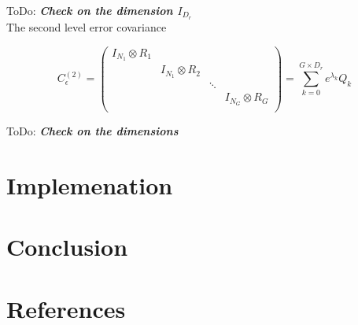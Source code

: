 \documentclass[final, paper=letter,5p,times,twocolumn]{elsarticle}
\newcommand{\ToDo}[1]{ToDo: \textbf{\textit{#1}}}
\theoremstyle{definition}
\begin{document}
\ToDo{Check on the dimension $I_{D_{r}}$} \\
The second level error covariance
  
\begin{equation}
  C_{\epsilon}^{(2)} =
  \left (
  \begin{array}{cccc}
    I_{N_{1}} \otimes R_{1} &&& \\
    &I_{N_{1}} \otimes R_{2} && \\
    && \ddots & \\
    &&& I_{N_{G}} \otimes R_{G} \\
  \end{array}
  \right ) =  \sum_{k = 0}^{G \times D_{r}} e^{\lambda_{k}} Q_{k}
  \label{}
\end{equation}

\ToDo{Check on the dimensions} \\

\section{Implemenation}




\section{Conclusion}

\section*{References}



\end{document}
